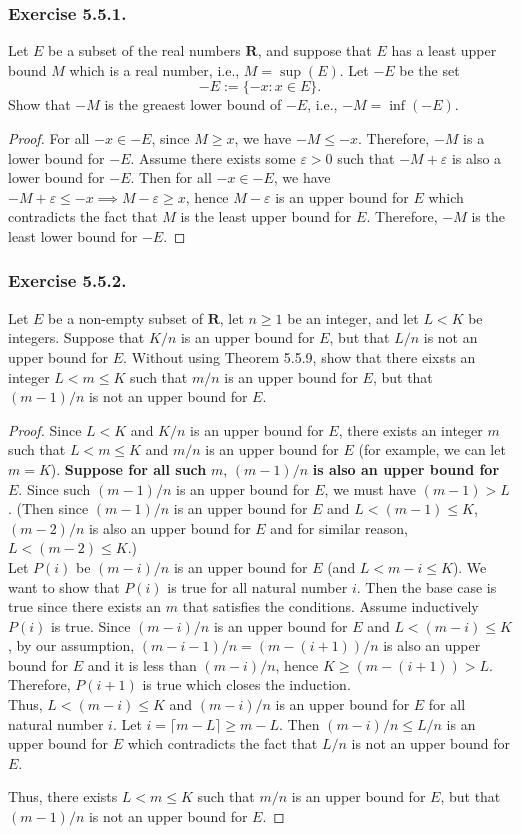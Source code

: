\documentclass[12pt, letter]{article}
\begin{document}
\subsubsection*{Exercise 5.5.1.}
Let $E$ be a subset of the real numbers $\mathbf{R}$, and suppose that $E$ has a least upper bound $M$ which is a real number, i.e., $M=\sup(E)$. Let $-E$
be the set \[-E:=\{-x:x\in E\}.\] Show that $-M$ is the greaest lower bound of $-E$, i.e., $-M=\inf(-E)$.
\begin{proof}
    For all $-x\in -E$, since $M\geq x$, we have $-M\leq -x$. Therefore, $-M$ is a lower bound for $-E$. Assume there exists some $\varepsilon>0$ such that $-M+\varepsilon$
    is also a lower bound for $-E$. Then for all $-x\in -E$, we have $-M+\varepsilon \leq -x\implies M-\varepsilon\geq x$, hence $M-\varepsilon$ is an upper bound for $E$   
    which contradicts the fact that $M$ is the least upper bound for $E$. Therefore, $-M$ is the least lower bound for $-E$.
\end{proof}
\subsubsection*{Exercise 5.5.2.}
Let $E$ be a non-empty subset of $\mathbf{R}$, let $n\geq 1$ be an integer, and let $L<K$ be integers. Suppose that $K/n$ is an upper bound for $E$, but that $L/n$ is not an upper bound for 
$E$. Without using Theorem 5.5.9, show that there eixsts an integer $L<m\leq K$ such that $m/n$ is an upper bound for $E$, but that $(m-1)/n$ is not an upper bound for $E$. 
\begin{proof}
    Since $L<K$ and $K/n$ is an upper bound for $E$, there exists an integer $m$ such that $L<m\leq K$ and $m/n$ is an upper bound for $E$ (for example, we can let $m=K$). 
    \textbf{Suppose for all such} $m$, $(m-1)/n$ \textbf{is also an upper bound for} $E$. Since such $(m-1)/n$ is an upper bound for $E$, we must have $(m-1)>L$. (Then since $(m-1)/n$ is an upper bound for $E$ and 
    $L<(m-1)\leq K$, $(m-2)/n$ is also an upper bound for $E$ and for similar reason, $L<(m-2)\leq K$.) \\
    Let $P(i)$ be $(m-i)/n$ is an upper bound for $E$ (and $L<m-i\leq K$). We want to show that $P(i)$ is true for all natural number $i$. 
    Then the base case is true since there exists an $m$ that satisfies the conditions. Assume inductively $P(i)$ is true. Since $(m-i)/n$ is an upper bound for $E$
    and $L<(m-i)\leq K$, by our assumption, $(m-i-1)/n=(m-(i+1))/n$ is also an upper bound for $E$ and it is less than $(m-i)/n$, hence $K\geq (m-(i+1))>L$. Therefore, $P(i+1)$ is true which closes the induction. 
    \\
    Thus, $L<(m-i)\leq K$ and $(m-i)/n$ is an upper bound for $E$ for all natural number $i$. Let $i=\lceil m-L\rceil\geq m-L$. Then $(m-i)/n\leq L/n$ is an upper bound for $E$ which contradicts the fact that 
    $L/n$ is not an upper bound for $E$.
    
    Thus, there exists $L<m\leq K$ such that $m/n$ is an upper bound for $E$, but that $(m-1)/n$ is not an upper bound for $E$. 
\end{proof} 
\end{document}
